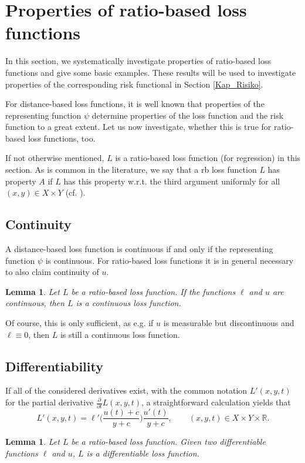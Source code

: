 \documentclass[10pt]{article}
\newcommand{\R}{\mathbb{R}}
\newcommand{\XY}{X \times Y}
\newtheorem{lemma}[theorem]{Lemma}
\begin{document}
\section{Properties of ratio-based loss functions} \label{Kap_Eigenschaften}
In this section, we systematically investigate properties of ratio-based loss functions and give some basic examples. These results will be used to investigate properties of the 
corresponding risk functional in Section \ref{Kap_Risiko}.\par
For distance-based loss functions, it is well known that properties of the representing function $\psi$ determine properties of the loss function and the risk function to a great extent.  	
Let us now investigate, whether this is true for ratio-based loss functions, too.\par
If not otherwise mentioned, $L$ is a ratio-based loss function (for regression) in this section. 
As is common in the literature, we say that a rb loss function $L$ has property 
$A$ if $L$ has this property w.r.t. the third argument uniformly for all $(x,y)\in\XY$ (cf. \cite[Chapter 2.2]{SC08}).

\subsection{Continuity}
A distance-based loss function is continuous if and only if the representing function $\psi$ is continuous.
For ratio-based loss functions it is in general necessary to also claim continuity of $u$. 
\begin{lemma} \label{LemmaLstetig}
	Let $L$ be a ratio-based loss function. If the functions $\ell$ and $u$ are continuous, then $L$ is a continuous loss function.
\end{lemma}	
Of course, this is only sufficient, as e.g. if $u$ is measurable but discontinuous and $\ell \equiv 0$, then $L$ is still a continuous loss function.

\subsection{Differentiability} \label{chapter_diff}
If all of the considered derivatives exist, with the common notation $L'(x,y,t)$ for the partial derivative $\frac{\partial}{\partial t}L(x,y,t)$, a straightforward calculation yields that 
\begin{equation*} 
	L'(x,y,t) = \ell'\biggl(\frac{u(t)+ c}{y + c}\biggr) \frac{u'(t)}{y + c}, \qquad (x,y,t) \in \XY \times \R.
\end{equation*}
\begin{lemma} \label{LemmaLdiff}
	Let $L$ be a ratio-based loss function. 
	Given two differentiable functions $\ell$ and $u$, $L$ is a differentiable loss function.
\end{lemma}
\end{document}
